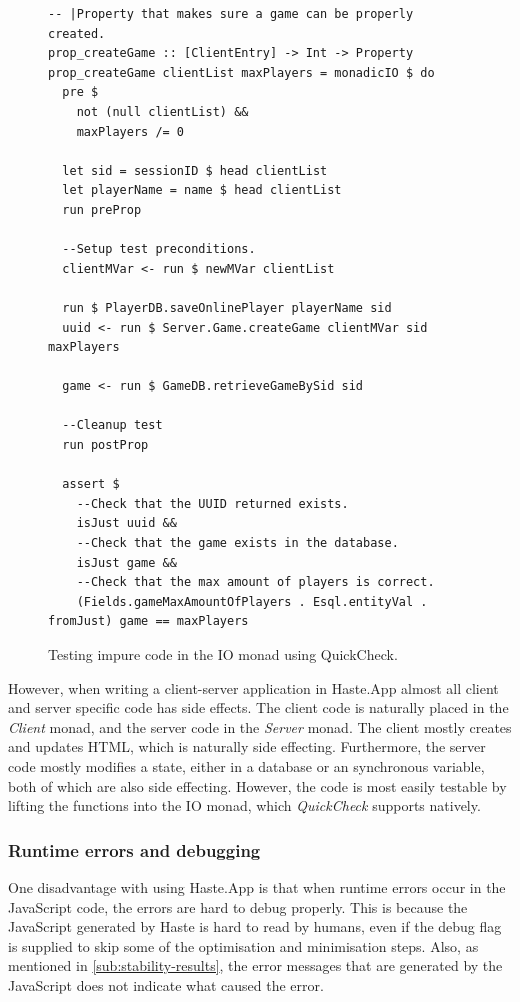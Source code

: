 \documentclass[a4paper]{article}
\begin{document}
\begin{figure}[h!]
    \begin{lstlisting}
-- |Property that makes sure a game can be properly created.
prop_createGame :: [ClientEntry] -> Int -> Property
prop_createGame clientList maxPlayers = monadicIO $ do
  pre $
    not (null clientList) &&
    maxPlayers /= 0

  let sid = sessionID $ head clientList
  let playerName = name $ head clientList
  run preProp

  --Setup test preconditions.
  clientMVar <- run $ newMVar clientList

  run $ PlayerDB.saveOnlinePlayer playerName sid
  uuid <- run $ Server.Game.createGame clientMVar sid maxPlayers

  game <- run $ GameDB.retrieveGameBySid sid

  --Cleanup test
  run postProp

  assert $
    --Check that the UUID returned exists.
    isJust uuid &&
    --Check that the game exists in the database.
    isJust game &&
    --Check that the max amount of players is correct.
    (Fields.gameMaxAmountOfPlayers . Esql.entityVal . fromJust) game == maxPlayers
    \end{lstlisting}
    \caption{Testing impure code in the IO monad using QuickCheck.}
    \label{fig:quickcheck-monadic}
\end{figure}

However, when writing a client-server application in Haste.App almost all client and server specific code has side effects. The client code is naturally placed in the \textit{Client} monad, and the server code in the \textit{Server} monad. The client mostly creates and updates HTML, which is naturally side effecting. Furthermore, the server code mostly modifies a state, either in a database or an synchronous variable, both of which are also side effecting. However, the code is most easily testable by lifting the functions into the IO monad, which \textit{QuickCheck} supports natively.


\subsubsection{Runtime errors and debugging}
\label{subsub:runtime-errors-debugging}
One disadvantage with using Haste.App is that when runtime errors occur in the JavaScript code, the errors are hard to debug properly. This is because the JavaScript generated by Haste is hard to read by humans, even if the debug flag is supplied to skip some of the optimisation and minimisation steps. Also, as mentioned in \cref{sub:stability-results}, the error messages that are generated by the JavaScript does not indicate what caused the error. 
\end{document}
